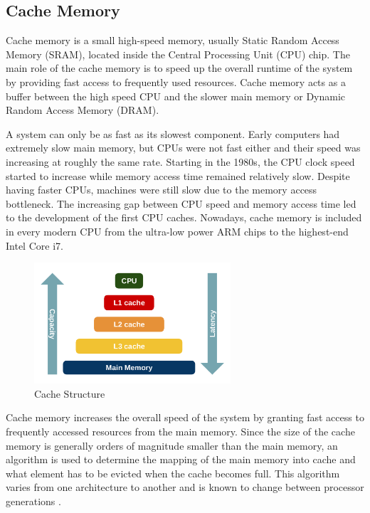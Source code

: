 \documentclass[10pt,a4paper,twoside]{book}
\begin{document}
\subsection{Cache Memory}
\label{cachememorytb}

Cache memory is a small high-speed memory, usually Static Random Access Memory (SRAM), located inside the Central Processing Unit (CPU) chip. The main role of the cache memory is to speed up the overall runtime of the system by providing fast access to frequently used resources. Cache memory acts as a buffer between the high speed CPU and the slower main memory or Dynamic Random Access Memory (DRAM).

A system can only be as fast as its slowest component. Early computers had extremely slow main memory, but CPUs were not fast either and their speed was increasing at roughly the same rate. Starting in the 1980s, the CPU clock speed started to increase while memory access time remained relatively slow. Despite having faster CPUs, machines were still slow due to the memory access bottleneck. The increasing gap between CPU speed and memory access time led to the development of the first CPU caches. Nowadays, cache memory is included in every modern CPU from the ultra-low power ARM chips to the highest-end Intel Core i7.

\begin{figure}[h]
\centering
\includegraphics[height=4.5cm]{figures/cache.png}
\caption{Cache Structure\cite{cachehierarchyimg}}
\label{fig:cache}
\end{figure}

Cache memory increases the overall speed of the system by granting fast access to frequently accessed resources from the main memory. Since the size of the cache memory is generally orders of magnitude smaller than the main memory, an algorithm is used to determine the mapping of the main memory into cache and what element has to be evicted when the cache becomes full. This algorithm varies from one architecture to another and is known to change between processor generations \cite{oren2015spy}. 
\end{document}
